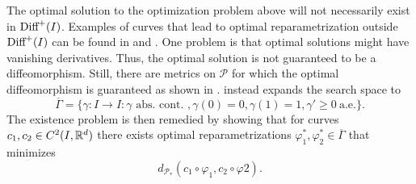 The optimal solution to the optimization problem above will not necessarily exist in \(\text{Diff}^+(I)\). Examples of curves that lead to optimal reparametrization outside \(\text{Diff}^+(I)\) can be found in \cite[p.11]{bauer2015why} and \cite[Section 3.2]{woien2019}. One problem is that optimal solutions might have vanishing derivatives. Thus, the optimal solution is not guaranteed to be a diffeomorphism. Still, there are metrics on \(\mathcal{P}\) for which the optimal diffeomorphism is guaranteed as shown in \cite{bauer2014overview}. \citeauthor{bruveris1016_srvtexample} \cite{bruveris1016_srvtexample} instead expands the search space to
\begin{equation*}
  \overline \Gamma = \{\gamma : I \rightarrow I : \gamma \text{\ abs. \ cont. }, \gamma(0) = 0, \gamma(1) = 1, \gamma' \geq 0 \ \text{a.e.}\}.
\end{equation*}
The existence problem is then remedied by showing that for curves \(c_1, c_2 \in C^2(I,\mathbb{R}^d)\) there exists optimal reparametrizations \(\varphi_1^*, \varphi_2^* \in \overline{ \Gamma}\) that minimizes
\begin{equation*}
  d_{\mathcal{P}_*}(c_1 \circ \varphi_1, c_2 \circ \varphi2).
\end{equation*}


